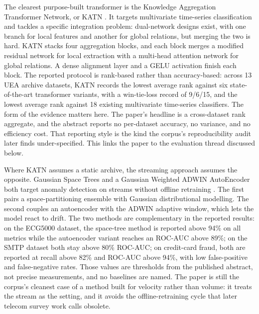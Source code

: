 \documentclass[pdflatex,sn-basic,Numbered]{sn-jnl}%
\begin{document}
The clearest purpose-built transformer is the Knowledge Aggregation Transformer Network, or KATN \citep{xiao2025katn}. It targets multivariate time-series classification and tackles a specific integration problem: dual-network designs exist, with one branch for local features and another for global relations, but merging the two is hard. KATN stacks four aggregation blocks, and each block merges a modified residual network for local extraction with a multi-head attention network for global relations. A dense alignment layer and a GELU activation finish each block. The reported protocol is rank-based rather than accuracy-based: across 13 UEA archive datasets, KATN records the lowest average rank against six state-of-the-art transformer variants, with a win-tie-loss record of 9/6/15, and the lowest average rank against 18 existing multivariate time-series classifiers. The form of the evidence matters here. The paper's headline is a cross-dataset rank aggregate, and the abstract reports no per-dataset accuracy, no variance, and no efficiency cost. That reporting style is the kind the corpus's reproducibility audit later finds under-specified. This links the paper to the evaluation thread discussed below.

Where KATN assumes a static archive, the streaming approach assumes the opposite. Gaussian Space Trees and a Gaussian Weighted ADWIN AutoEncoder both target anomaly detection on streams without offline retraining \citep{gunbilek2026enhanced}. The first pairs a space-partitioning ensemble with Gaussian distributional modelling. The second couples an autoencoder with the ADWIN adaptive window, which lets the model react to drift. The two methods are complementary in the reported results: on the ECG5000 dataset, the space-tree method is reported above 94\% on all metrics while the autoencoder variant reaches an ROC-AUC above 89\%; on the SMTP dataset both stay above 80\% ROC-AUC; on credit-card fraud, both are reported at recall above 82\% and ROC-AUC above 94\%, with low false-positive and false-negative rates. Those values are thresholds from the published abstract, not precise measurements, and no baselines are named. The paper is still the corpus's cleanest case of a method built for velocity rather than volume: it treats the stream as the setting, and it avoids the offline-retraining cycle that later telecom survey work calls obsolete.
\end{document}

